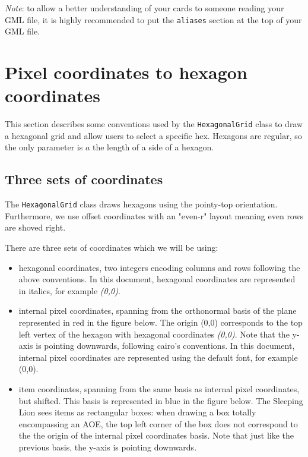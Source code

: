 \documentclass{article}
\begin{document}
\textit{Note}: to allow a better understanding of your cards to someone reading your GML file, it is highly recommended to put the \verb`aliases` section at the top of your GML file.

\pagebreak
\section{Pixel coordinates to hexagon coordinates}
This section describes some conventions used by the \verb`HexagonalGrid` class to draw a hexagonal grid and allow users to select a specific hex. Hexagons are regular, so the only parameter is $a$ the length of a side of a hexagon.

\subsection{Three sets of coordinates}
The \verb`HexagonalGrid` class draws hexagons using the pointy-top orientation. Furthermore, we use offset coordinates with an "even-r" layout meaning even rows are shoved right.

There are three sets of coordinates which we will be using:
\begin{itemize}
\item hexagonal coordinates, two integers encoding columns and rows following the above conventions. In this document, hexagonal coordinates are represented in italics, for example \textit{(0,0)}.
\item internal pixel coordinates, spanning from the orthonormal basis of the plane represented in red in the figure below. The origin (0,0) corresponds to the top left vertex of the hexagon with hexagonal coordinates \textit{(0,0)}. Note that the y-axis is pointing downwards, following cairo's conventions. In this document, internal pixel coordinates are represented using the default font, for example (0,0).
\item item coordinates, spanning from the same basis as internal pixel coordinates, but shifted. This basis is represented in blue in the figure below. The Sleeping Lion sees items as rectangular boxes: when drawing a box totally encompassing an AOE, the top left corner of the box does not correspond to the the origin of the internal pixel coordinates basis. Note that just like the previous basis, the y-axis is pointing downwards.
\end{itemize}
\end{document}
